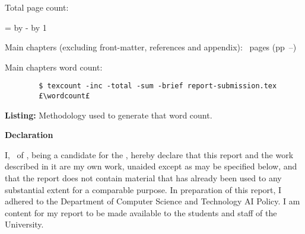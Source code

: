 \else

\begin{sffamily}
Total page count: \pageref{LastPage}

\makeatletter
\@tempcnta=\relax%
\advance\@tempcnta by -%
\advance\@tempcnta by 1%
\xdef\contentpages{\the\@tempcnta}%
\makeatother

Main chapters (excluding front-matter, references and appendix):
\contentpages~pages
(pp~\pageref{firstcontentpage}--\pageref{lastcontentpage})

Main chapters word count: \wordcount

\vspace*{2em}
\begin{code}
    \begin{verbatim}
        $ texcount -inc -total -sum -brief report-submission.tex
        £\wordcount£
    \end{verbatim}
    \captionsetup{textfont=sf}
    \caption*{\textbf{Listing:} Methodology used to generate that word count.}
\end{code}



\vspace{\fill}
\onehalfspacing
\makeatletter
\textbf{\Huge Declaration}
\vspace{40pt}

I, \@author\ of \college, being a candidate for the \course, hereby declare that
this report and the work described in it are my own work, unaided except as may
be specified below, and that the report does not contain material that has
already been used to any substantial extent for a comparable purpose. In
preparation of this report, I adhered to the Department of Computer Science and
Technology AI Policy. I am content for my report to be made available to the
students and staff of the University.



\end{sffamily}
